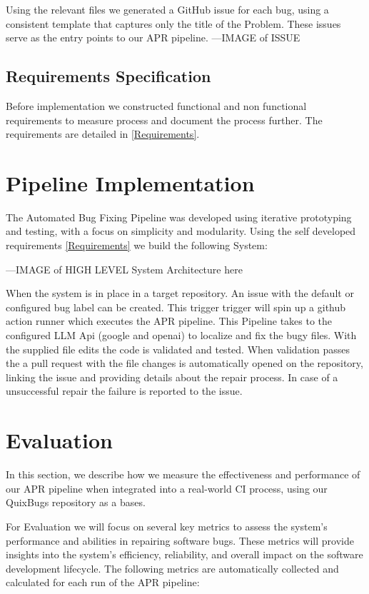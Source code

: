 Using the relevant files we generated a GitHub issue for each bug, using a consistent template that captures only the title of the Problem. These issues serve as the entry points to our APR pipeline.
---IMAGE of ISSUE

\subsection{Requirements Specification}
Before implementation we constructed functional and non functional requirements to measure process and document the process further. The requirements are detailed in \ref{Requirements}.

\section{Pipeline Implementation}
The Automated Bug Fixing Pipeline was developed using iterative prototyping and testing, with a focus on simplicity and modularity. Using the self developed requirements \ref{Requirements} we build the following System:

---IMAGE of HIGH LEVEL System Architecture here

When the system is in place in a target repository. An issue with the default or configured bug label can be created. This trigger trigger will spin up a github action runner which executes the APR pipeline. This Pipeline takes to the configured LLM Api (google and openai) to localize and fix the bugy files. With the supplied file edits the code is validated and tested. When validation passes the a pull request with the file changes is automatically opened on the repository, linking the issue and providing details about the repair process. In case of a unsuccessful repair the failure is reported to the issue.


\section{Evaluation}

In this section, we describe how we measure the effectiveness and performance of our APR pipeline when integrated into a real-world CI process, using our QuixBugs repository as a bases.

For Evaluation we will focus on several key metrics to assess the system's performance and abilities in repairing software bugs. These metrics will provide insights into the system's efficiency, reliability, and overall impact on the software development lifecycle. The following metrics are automatically collected and calculated for each run of the APR pipeline:

